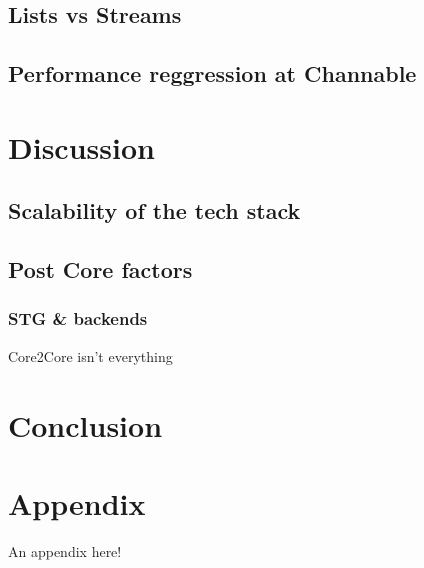 \documentclass{report}
\begin{document}
\section{Lists vs Streams}

\section{Performance reggression at Channable}

\chapter{Discussion}
\section{Scalability of the tech stack}
\section{Post Core factors}
\subsection{STG \& backends}
Core2Core isn't everything

\chapter{Conclusion}









\appendix
\clearpage
{}
\chapter{Appendix}
An appendix here!
\end{document}

